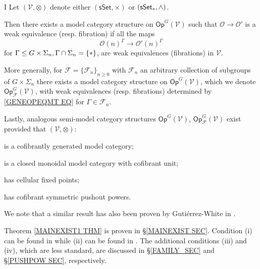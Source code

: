 \documentclass[a4paper,10pt
,draft
]{article}%
\numberwithin{equation}{section}
\numberwithin{figure}{section}
\theoremstyle{definition} %
\renewcommand{\O}{\ensuremath{\mathcal O}}
\newcommand{\1}{\ensuremath{\mathbbm 1}}%
\begin{document}
\begin{customthm}{I}\label{MAINEXIST1 THM}
Let $(\mathcal{V},\otimes)$
denote either 
$(\mathsf{sSet}, \times)$
or
$(\mathsf{sSet}_{\**}, \wedge)$.

Then there exists a model category structure on 
$\mathsf{Op}^G(\mathcal{V})$ such that 
$\O \to \O'$ is a weak equivalence (resp. fibration)
if all the maps
\begin{equation}\label{GENEOPEQMT EQ}
	\O(n)^{\Gamma} \to \O'(n)^{\Gamma}
\end{equation}
for 
$\Gamma \leq G\times \Sigma_n, \Gamma \cap \Sigma_n = \{\**\}$, 
are weak equivalences (fibrations) in $\mathcal{V}$.

More generally, for $\mathcal{F} = \{\mathcal{F}_n\}_{n \geq 0}$ with $\mathcal{F}_n$ an arbitrary collection of subgroups of $G \times \Sigma_n$ there exists a model category structure on 
$\mathsf{Op}^G(\mathcal{V})$,
which we denote
$\mathsf{Op}^G_{\mathcal{F}}(\mathcal{V})$,
with weak equivalences (resp. fibrations)
determined by \eqref{GENEOPEQMT EQ} for $\Gamma \in \mathcal{F}_n$.

Lastly, 
analogous 
semi-model category structures
$\mathsf{Op}^G(\mathcal{V})$,
$\mathsf{Op}^G_{\mathcal{F}}(\mathcal{V})$
exist
provided that
$(\mathcal{V},\otimes)$:
\begin{inparaenum}
\item[(i)] is a cofibrantly generated model category;
\item [(ii)] is a closed monoidal model category with cofibrant unit;
\item[(iii)] has cellular fixed points;
\item[(iv)] has cofibrant symmetric pushout powers.
\end{inparaenum}
\end{customthm}

We note that a similar result has also been proven by Guti\'{e}rrez-White in \cite{GW18}.

Theorem \ref{MAINEXIST1 THM}
is proven in \S \ref{MAINEXIST SEC}.
Condition (i) can be found in 
\cite[Def. 2.1.17]{Ho98} while (ii) 
can be found in \cite[Def. 4.2.6]{Ho98}.
The additional conditions (iii) and (iv),
which are less standard, are discussed in 
\S \ref{FAMILY_SEC} and
\S \ref{PUSHPOW SEC}, respectively.
\end{document}

